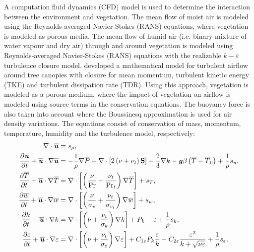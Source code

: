 A computation fluid dynamics (CFD) model is used to determine the interaction between the environment and vegetation. The mean flow of moist air is modeled using the Reynolds-averaged Navier-Stokes (RANS) equations, where vegetation is modeled as porous media. The mean flow of humid air (i.e. binary mixture of water vapour and dry air) through and around vegetation is modeled using Reynolds-averaged Navier-Stokes (RANS) equations with the realizable $k-\varepsilon$ turbulence closure model. \cite{Wilson1977} developed a mathematical model for turbulent airflow around tree canopies with closure for mean momentum, turbulent kinetic energy (TKE) and turbulent dissipation rate (TDR). Using this approach, vegetation is modeled as a porous medium, where the impact of vegetation on airflow is modeled using source terms in the conservation equations. The buoyancy force is also taken into account where the Boussinesq approximation is used for air density variations. The equations consist of conservation of mass, momentum, temperature, humidity and the turbulence model, respectively:
\begin{align}
\nabla  \cdot \overline{\textbf{\textit{u}}} &= {s_\rho },
\label{eq:conservationeq_incompressible1}\\
\frac{{\partial \overline{\textbf{\textit{u}}}}}{{\partial t}} + \overline{\textbf{\textit{u}}} \cdot \nabla \overline{\textbf{\textit{u}}} &=  - \frac{1}{\rho }\nabla \overline{P} + \nabla  \cdot \left[ {2\left( {\nu  + {\nu _t}} \right)\mathbf{S}} \right] - \frac{2}{3}\nabla k - \textbf{\textit{g}}\beta \left( {\overline{T} - \overline{T}_0} \right) + \frac{1}{\rho }{s_u},\\
\frac{{\partial \overline{T}}}{{\partial t}} + \overline{\textbf{\textit{u}}} \cdot \nabla \overline{T} &= \nabla  \cdot \left[ \left( \frac{\nu}{\mathrm{Pr}} + \frac{\nu_t}{\mathrm{Pr}_t} \right)\nabla \overline{T} \right] + s_T,\\
\frac{{\partial \overline{w}}}{{\partial t}} + \overline{\textbf{\textit{u}}} \cdot \nabla \overline{w} &= \nabla  \cdot \left[ {\left( {\frac{\nu }{{{\sigma_v}}} + \frac{{{\nu _t}}}{{{\sigma _{{v_t}}}}}} \right)\nabla  \overline{w}} \right] + {s_w},\\
\frac{{\partial k}}{{\partial t}} + \overline{\textbf{\textit{u}}} \cdot \nabla k &= \nabla  \cdot \left[ {\left( {\nu  + \frac{{{\nu _t}}}{{{\sigma _k}}}} \right)\nabla k} \right] + {P_k} - \varepsilon  + \frac{1}{\rho }{s_k},\\
\frac{{\partial \varepsilon }}{{\partial t}} +  \overline{\textbf{\textit{u}}} \cdot \nabla \varepsilon  &= \nabla  \cdot \left[ {\left( {\nu  + \frac{{{\nu _t}}}{{{\sigma _\varepsilon }}}} \right)\nabla \varepsilon } \right] + {C_{1\varepsilon }}{P_k}\frac{\varepsilon }{k} - {C_{2\varepsilon }}\frac{{{\varepsilon ^2}}}{{k + \sqrt {\nu \varepsilon } }} + \frac{1}{\rho }{s_\varepsilon },
\label{eq:conservationeq_incompressible6}
\end{align}

